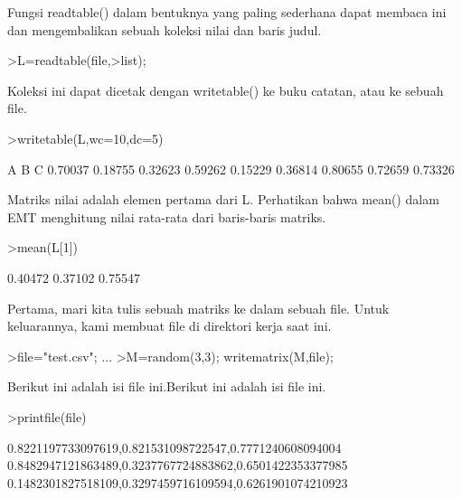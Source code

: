 \documentclass[a4paper,10pt]{article}
\begin{document}
\begin{eulernotebook}
\begin{eulercomment}
\begin{eulercomment}
\begin{eulercomment}
\begin{eulercomment}
\begin{euleroutput}
\end{euleroutput}
\begin{eulercomment}
Fungsi readtable() dalam bentuknya yang paling sederhana dapat membaca
ini dan mengembalikan sebuah koleksi nilai dan baris judul.
\end{eulercomment}
\begin{eulerprompt}
>L=readtable(file,>list);
\end{eulerprompt}
\begin{eulercomment}
Koleksi ini dapat dicetak dengan writetable() ke buku catatan, atau ke
sebuah file.
\end{eulercomment}
\begin{eulerprompt}
>writetable(L,wc=10,dc=5)
\end{eulerprompt}
\begin{euleroutput}
           A         B         C
     0.70037   0.18755   0.32623
     0.59262   0.15229   0.36814
     0.80655   0.72659   0.73326
\end{euleroutput}
\begin{eulercomment}
Matriks nilai adalah elemen pertama dari L. Perhatikan bahwa mean()
dalam EMT menghitung nilai rata-rata dari baris-baris matriks.
\end{eulercomment}
\begin{eulerprompt}
>mean(L[1])
\end{eulerprompt}
\begin{euleroutput}
    0.40472 
    0.37102 
    0.75547 
\end{euleroutput}
\begin{eulercomment}
Pertama, mari kita tulis sebuah matriks ke dalam sebuah file. Untuk
keluarannya, kami membuat file di direktori kerja saat ini.
\end{eulercomment}
\begin{eulerprompt}
>file="test.csv";  ...
>M=random(3,3); writematrix(M,file);
\end{eulerprompt}
\begin{eulercomment}
Berikut ini adalah isi file ini.Berikut ini adalah isi file ini.
\end{eulercomment}
\begin{eulerprompt}
>printfile(file)
\end{eulerprompt}
\begin{euleroutput}
  0.8221197733097619,0.821531098722547,0.7771240608094004
  0.8482947121863489,0.3237767724883862,0.6501422353377985
  0.1482301827518109,0.3297459716109594,0.6261901074210923
  

\end{euleroutput}
\end{eulercomment}
\end{eulercomment}
\end{eulercomment}
\end{eulercomment}
\end{eulernotebook}
\end{document}
